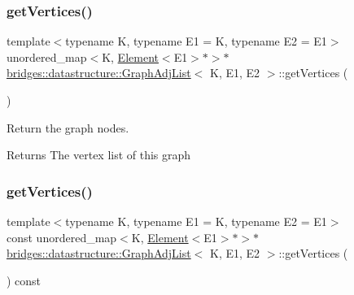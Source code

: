 \subsubsection{\texorpdfstring{get\+Vertices()}{getVertices()}\hspace{0.1cm}{\footnotesize\ttfamily [1/2]}}
{\footnotesize\ttfamily template$<$typename K, typename E1 = K, typename E2 = E1$>$ \\
unordered\+\_\+map$<$K, \hyperlink{classbridges_1_1datastructure_1_1_element}{Element}$<$E1$>$$\ast$$>$$\ast$ \hyperlink{classbridges_1_1datastructure_1_1_graph_adj_list}{bridges\+::datastructure\+::\+Graph\+Adj\+List}$<$ K, E1, E2 $>$\+::get\+Vertices (\begin{DoxyParamCaption}{ }\end{DoxyParamCaption})\hspace{0.3cm}{\ttfamily [inline]}}



Return the graph nodes. 

\begin{DoxyReturn}{Returns}
The vertex list of this graph 
\end{DoxyReturn}
\mbox{\label{classbridges_1_1datastructure_1_1_graph_adj_list_a77b21cfdb87c4cf45ce29be6e7dd9791}} 
\subsubsection{\texorpdfstring{get\+Vertices()}{getVertices()}\hspace{0.1cm}{\footnotesize\ttfamily [2/2]}}
{\footnotesize\ttfamily template$<$typename K, typename E1 = K, typename E2 = E1$>$ \\
const unordered\+\_\+map$<$K, \hyperlink{classbridges_1_1datastructure_1_1_element}{Element}$<$E1$>$$\ast$$>$$\ast$ \hyperlink{classbridges_1_1datastructure_1_1_graph_adj_list}{bridges\+::datastructure\+::\+Graph\+Adj\+List}$<$ K, E1, E2 $>$\+::get\+Vertices (\begin{DoxyParamCaption}{ }\end{DoxyParamCaption}) const\hspace{0.3cm}{\ttfamily [inline]}}



